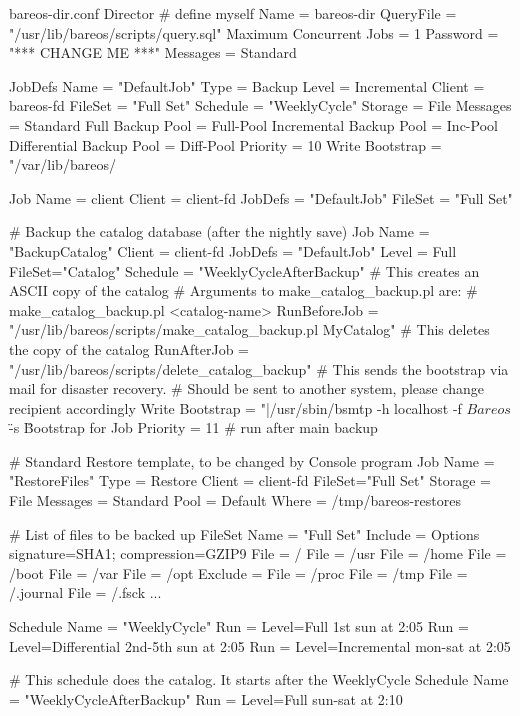 \begin{bconfig}{bareos-dir.conf}
Director {          # define myself
  Name = bareos-dir
  QueryFile = "/usr/lib/bareos/scripts/query.sql"
  Maximum Concurrent Jobs = 1
  Password = "*** CHANGE ME ***"
  Messages = Standard
}

JobDefs {
  Name = "DefaultJob"
  Type = Backup
  Level = Incremental
  Client = bareos-fd
  FileSet = "Full Set"
  Schedule = "WeeklyCycle"
  Storage = File
  Messages = Standard
  Full Backup Pool = Full-Pool
  Incremental Backup Pool = Inc-Pool
  Differential Backup Pool = Diff-Pool
  Priority = 10
  Write Bootstrap = "/var/lib/bareos/%
}

Job {
  Name = client
  Client = client-fd
  JobDefs = "DefaultJob"
  FileSet = "Full Set"
}

# Backup the catalog database (after the nightly save)
Job {
  Name = "BackupCatalog"
  Client = client-fd
  JobDefs = "DefaultJob"
  Level = Full
  FileSet="Catalog"
  Schedule = "WeeklyCycleAfterBackup"
  # This creates an ASCII copy of the catalog
  # Arguments to make_catalog_backup.pl are:
  #  make_catalog_backup.pl <catalog-name>
  RunBeforeJob = "/usr/lib/bareos/scripts/make_catalog_backup.pl MyCatalog"
  # This deletes the copy of the catalog
  RunAfterJob  = "/usr/lib/bareos/scripts/delete_catalog_backup"
  # This sends the bootstrap via mail for disaster recovery.
  # Should be sent to another system, please change recipient accordingly
  Write Bootstrap = "|/usr/sbin/bsmtp -h localhost -f \"\(Bareos\) \" -s \"Bootstrap for Job %
  Priority = 11                   # run after main backup
}

# Standard Restore template, to be changed by Console program
Job {
  Name = "RestoreFiles"
  Type = Restore
  Client = client-fd
  FileSet="Full Set"
  Storage = File
  Messages = Standard
  Pool = Default
  Where = /tmp/bareos-restores
}

# List of files to be backed up
FileSet {
  Name = "Full Set"
  Include = { Options { signature=SHA1; compression=GZIP9 }
    File = /
    File = /usr
    File = /home
    File = /boot
    File = /var
    File = /opt
  }
  Exclude = {
    File = /proc
    File = /tmp
    File = /.journal
    File = /.fsck
    ...
  }
}

Schedule {
  Name = "WeeklyCycle"
  Run = Level=Full 1st sun at 2:05
  Run = Level=Differential 2nd-5th sun at 2:05
  Run = Level=Incremental mon-sat at 2:05
}

# This schedule does the catalog. It starts after the WeeklyCycle
Schedule {
  Name = "WeeklyCycleAfterBackup"
  Run = Level=Full sun-sat at 2:10
}


\end{bconfig}
